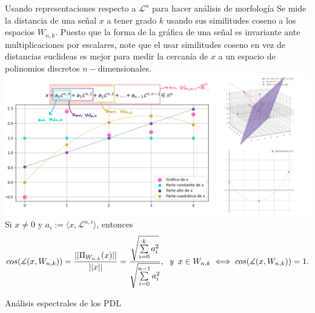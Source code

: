 \documentclass[final,hyperref={pdfpagelabels=false}]{beamer}
\newcommand{\suma}[3]{\sum\limits_{#1}^{#2}#3} %
\newcommand{\cali}[1]{\mathcal{#1}} %
\begin{document}
\begin{frame}
\begin{columns}
\begin{column}{.49\textwidth}
            	\begin{block}{Usando representaciones respecto a 
            	$\cali{L}^{n}$ para hacer an\'alisis de morfolog\'ia}
            	Se mide la distancia de una se\~nal $x$ a tener 
            	grado $k$ usando sus similitudes coseno a los espacios
            	$W_{n,k}$. Puesto que la forma de la gr\'afica de una se\~nal
            	es invariante ante multiplicaciones por escalares, note que
            	el usar similitudes coseno en vez de distancias euclideas es
            	mejor para medir la cercan\'ia de $x$ a un espacio
            	de polinomios discretos $n-$dimensionales.
			\includegraphics[width=0.95\linewidth]{analisis_forma}	
			Si $x \neq 0$ y $a_{i} := \langle x, \cali{L}^{n,i} \rangle$, entonces 
			\[
			cos(\measuredangle(x, W_{n,k})) = 
			\frac{||\Pi_{W_{n,k}}(x)||}{||x||}			
			=
			\frac{
			\sqrt{\suma{i=0}{k}{a_{i}^{2}}}}
			{\sqrt{\suma{i=0}{n-1}{a_{i}^{2}}}},
			\hspace{0.2cm} \textit{y} \hspace{0.2cm}
			x \in W_{n,k} \iff cos(\measuredangle(x, W_{n,k})) = 1.
			\]			
			\end{block}			                        
            \vfill
            \vspace{1cm}


            \begin{block}{An\'alisis espectrales de los PDL}
              \begin{columns}
\end{columns}
\end{block}
\end{column}
\end{columns}
\end{frame}
\end{document}
